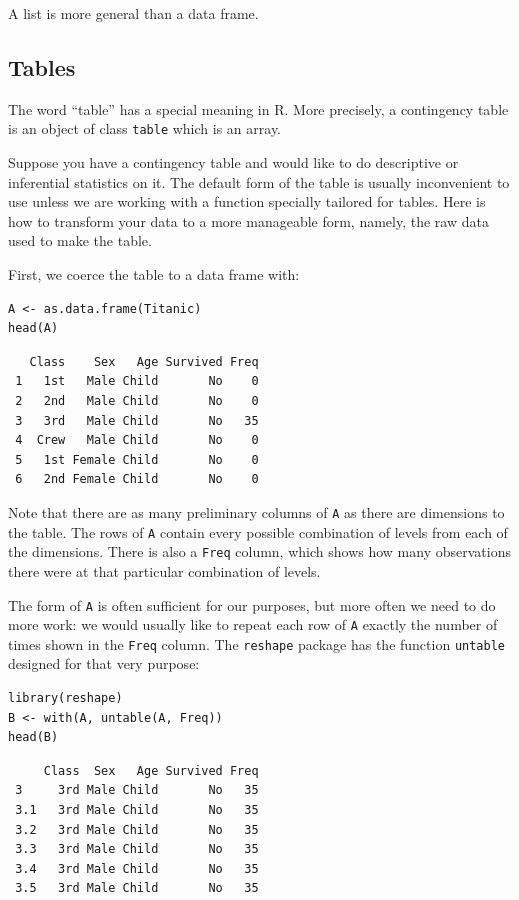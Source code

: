 \documentclass[captions=tableheading]{scrbook}
\begin{document}
A list is more general than a data frame.
\subsection{Tables}
\label{sec-20-1-5}

The word ``table'' has a special meaning in \textsf{R}. More precisely, a contingency table is an object of class \texttt{table} which is an array.

Suppose you have a contingency table and would like to do descriptive or inferential statistics on it. The default form of the table is usually inconvenient to use unless we are working with a function specially tailored for tables. Here is how to transform your data to a more manageable form, namely, the raw data used to make the table.

First, we coerce the table to a data frame with: 


\begin{verbatim}
A <- as.data.frame(Titanic)
head(A)
\end{verbatim}

\begin{verbatim}
   Class    Sex   Age Survived Freq
 1   1st   Male Child       No    0
 2   2nd   Male Child       No    0
 3   3rd   Male Child       No   35
 4  Crew   Male Child       No    0
 5   1st Female Child       No    0
 6   2nd Female Child       No    0
\end{verbatim}

Note that there are as many preliminary columns of \texttt{A} as there are dimensions to the table. The rows of \texttt{A} contain every possible combination of levels from each of the dimensions. There is also a \texttt{Freq} column, which shows how many observations there were at that particular combination of levels. 

The form of \texttt{A} is often sufficient for our purposes, but more often we need to do more work: we would usually like to repeat each row of \texttt{A} exactly the number of times shown in the \texttt{Freq} column. The \texttt{reshape} package \cite{Wickhamreshape} has the function \texttt{untable} designed for that very purpose: 


\begin{verbatim}
library(reshape)
B <- with(A, untable(A, Freq))
head(B)
\end{verbatim}

\begin{verbatim}
     Class  Sex   Age Survived Freq
 3     3rd Male Child       No   35
 3.1   3rd Male Child       No   35
 3.2   3rd Male Child       No   35
 3.3   3rd Male Child       No   35
 3.4   3rd Male Child       No   35
 3.5   3rd Male Child       No   35
\end{verbatim}
\end{document}
